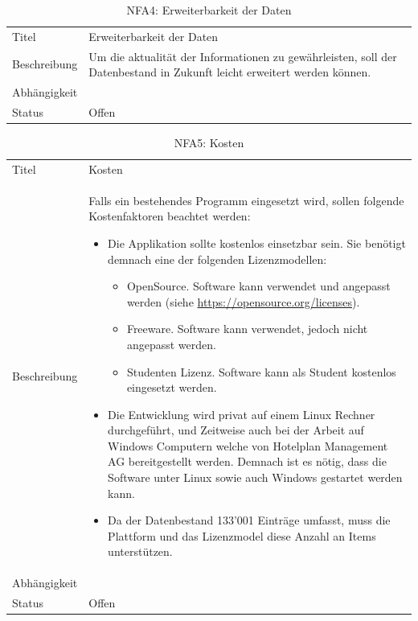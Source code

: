 \begin{table}[H] 
	\caption{NFA4: Erweiterbarkeit der Daten}
	\centering
	\label{fig:anforderungsanalyse:nichtfunktionaleanforderung:nfa4}
	\begin{tabular}{ | l | L{10cm} | } 
		\hline 
		 \\ \hline 
		Titel & Erweiterbarkeit der Daten \\ \hline 
		Beschreibung & Um die aktualität der Informationen zu gewährleisten, soll der Datenbestand in Zukunft leicht erweitert werden können. \\ \hline 
		Abhängigkeit & \\ \hline 
		Status & Offen \\ \hline 
	\end{tabular}
\end{table}
 
 \begin{table}[H] 
	\caption{NFA5: Kosten}
	\centering
	\label{fig:anforderungsanalyse:nichtfunktionaleanforderung:nfa5}
	\begin{tabular}{ | l | L{10cm} | } 
		\hline 
		 \\ \hline 
		Titel & Kosten \\ \hline 
		Beschreibung & Falls ein bestehendes Programm eingesetzt wird, sollen folgende Kostenfaktoren beachtet werden: 
		\begin{itemize}
		\item Die Applikation sollte kostenlos einsetzbar sein. Sie benötigt demnach eine der folgenden Lizenzmodellen:
		\begin{itemize}
		\item OpenSource. Software kann verwendet und angepasst werden (siehe \url{https://opensource.org/licenses}).
		\item Freeware. Software kann verwendet, jedoch nicht angepasst werden.
		\item Studenten Lizenz. Software kann als Student kostenlos eingesetzt werden.
		\end{itemize}
		\item Die Entwicklung wird privat auf einem Linux Rechner durchgeführt, und Zeitweise auch bei der Arbeit auf Windows Computern welche von Hotelplan Management AG bereitgestellt werden.
		Demnach ist es nötig, dass die Software unter Linux sowie auch Windows gestartet werden kann.
		\item Da der Datenbestand 133'001 Einträge umfasst, muss die Plattform und das Lizenzmodel diese Anzahl an Items unterstützen.
		\end{itemize}\\ \hline 
		Abhängigkeit & \\ \hline 
		Status & Offen \\ \hline 
	\end{tabular}
\end{table}

